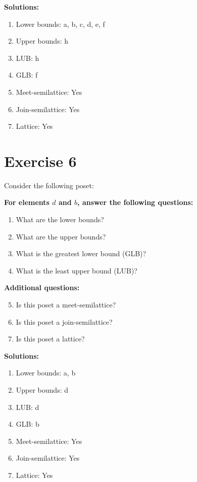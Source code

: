 \documentclass{article}
\begin{document}
\textbf{Solutions:}
\begin{enumerate}
    \item Lower bounds: {a, b, c, d, e, f}
    \item Upper bounds: {h}
    \item LUB: h
    \item GLB: f
    \item Meet-semilattice: Yes
    \item Join-semilattice: Yes
    \item Lattice: Yes
\end{enumerate}
\newpage
\section*{Exercise 6}
Consider the following poset:
\begin{center}
\end{center}

    \textbf{For elements $d$ and $b$, answer the following questions:}
\begin{enumerate}
    \item What are the lower bounds?
    \item What are the upper bounds?
    \item What is the greatest lower bound (GLB)?
    \item What is the least upper bound (LUB)?
\end{enumerate}
    \hspace*{3ex} \textbf{Additional questions:}
\begin{enumerate}
    \setcounter{enumi}{4}
    \item Is this poset a meet-semilattice?
    \item Is this poset a join-semilattice?
    \item Is this poset a lattice?
\end{enumerate}

\textbf{Solutions:}
\begin{enumerate}
    \item Lower bounds: {a, b}
    \item Upper bounds: {d}
    \item LUB: d
    \item GLB: b
    \item Meet-semilattice: Yes
    \item Join-semilattice: Yes
    \item Lattice: Yes
\end{enumerate}
\newpage
\end{document}
